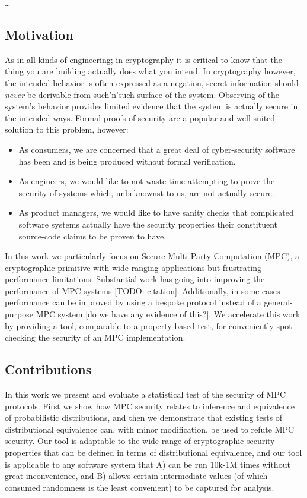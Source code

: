 \documentclass[conference]{IEEEtran}
\begin{document}
\dots  %

\subsection{Motivation}

As in all kinds of engineering; in cryptography it is critical to know that the thing you are building actually does what you intend.
In cryptography however, the intended behavior is often expressed as a negation,
\eg secret information should \textit{never} be derivable from such'n'such surface of the system.
Observing of the system's behavior provides limited evidence that the system is actually secure in the intended ways.
Formal proofs of security are a popular and well-suited solution to this problem, however:

\begin{itemize}
    \item As consumers, we are concerned that a great deal of cyber-security software has been and is being produced without formal verification.
    \item As engineers, we would like to not waste time attempting to prove the security of systems which, unbeknownst to us, are not actually secure.
    \item As product managers, we would like to have sanity checks
          that complicated software systems actually have the security properties their constituent source-code claims to be proven to have.
\end{itemize}

In this work we particularly focus on Secure Multi-Party Computation (MPC),
a cryptographic primitive with wide-ranging applications but frustrating performance limitations.
Substantial work has going into improving the performance of MPC systems [TODO: citation].
Additionally, in some cases performance can be improved by using a bespoke protocol instead of a general-purpose MPC system [do we have any evidence of this?].
We accelerate this work by providing a tool, comparable to a property-based test,
for conveniently spot-checking the security of an MPC implementation.

\subsection{Contributions}

In this work we present and evaluate a statistical test of the security of MPC protocols.
First we show how MPC security relates to inference and equivalence of probabilistic distributions,
and then we demonstrate that existing tests of distributional equivalence can, with minor modification, be used to refute MPC security.
Our tool is adaptable to the wide range of cryptographic security properties that can be defined in terms of distributional equivalence,
and our tool is applicable to any software system that
A) can be run 10k-1M times without great inconvenience, and
B) allows certain intermediate values (of which consumed randomness is the least convenient) to be captured for analysis.
\end{document}
